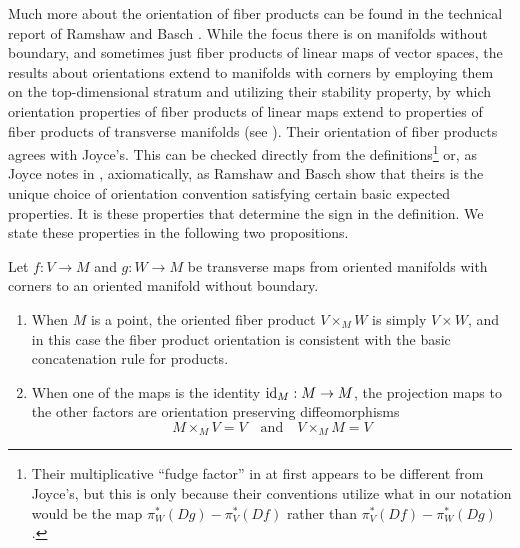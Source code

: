 Much more about the orientation of fiber products can be found in the technical report of Ramshaw and Basch \cite{RamBas09}.  While the focus there is on manifolds without boundary, and sometimes just fiber products of linear maps of vector spaces, the results about orientations extend to manifolds with corners by employing them on the top-dimensional stratum and utilizing their stability property, by which orientation properties of fiber products of linear maps extend to properties of fiber products of transverse manifolds (see \cite[Sections 6.3, 9.1.2, and 9.3]{RamBas09}). Their orientation of fiber products agrees with Joyce's. This can be checked directly from the definitions\footnote{Their multiplicative ``fudge factor'' in \cite[Theorem 9.14]{RamBas09} at first appears to be different from Joyce's, but this is only because their conventions utilize what in our notation would be the map $\pi_W^*(Dg)-\pi_V^*(Df)$ rather than $\pi_V^*(Df)-\pi_W^*(Dg)$.} or, as Joyce notes in \cite[Remark 7.6.iii]{Joy12}, axiomatically, as Ramshaw and Basch show that theirs is the unique choice of orientation convention satisfying certain basic expected properties. It is these properties that determine the sign in the definition. We state these properties in the following two propositions.

\begin{proposition}\label{P: oriented fiber product basic properties}
Let $f:V\to M$ and $g:W\to M$ be transverse maps from oriented manifolds with corners to an oriented manifold without boundary. 
\begin{enumerate}

\item When $M$ is a point, the oriented fiber product $V\times_M W$ is simply $V\times W$, and in this case the fiber product orientation is consistent with the basic concatenation rule for products.

\item  When one of the maps is the identity $\mathrm{id}_M:M\to M$, the projection maps to the other factors are orientation preserving diffeomorphisms  
\begin{equation*}
M\times_M V=V\quad\text{and}\quad V\times_MM=V
\end{equation*} 
\end{enumerate}
\end{proposition}

